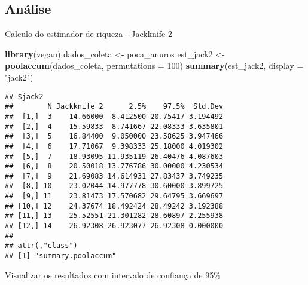 \documentclass[
]{book}
\newenvironment{Shaded}{\begin{snugshade}}{\end{snugshade}}
\newcommand{\DataTypeTok}[1]{\textcolor[rgb]{0.13,0.29,0.53}{#1}}
\newcommand{\DecValTok}[1]{\textcolor[rgb]{0.00,0.00,0.81}{#1}}
\newcommand{\KeywordTok}[1]{\textcolor[rgb]{0.13,0.29,0.53}{\textbf{#1}}}
\newcommand{\NormalTok}[1]{#1}
\newcommand{\StringTok}[1]{\textcolor[rgb]{0.31,0.60,0.02}{#1}}
\begin{document}
\hypertarget{anuxe1lise-4}{%
\subsection{Análise}\label{anuxe1lise-4}}

Calculo do estimador de riqueza - Jackknife 2

\begin{Shaded}
\begin{Highlighting}[]
\KeywordTok{library}\NormalTok{(vegan)}
\NormalTok{dados_coleta <-}\StringTok{ }\NormalTok{poca_anuros}
\NormalTok{est_jack2 <-}\StringTok{ }\KeywordTok{poolaccum}\NormalTok{(dados_coleta, }\DataTypeTok{permutations =} \DecValTok{100}\NormalTok{)}
\KeywordTok{summary}\NormalTok{(est_jack2, }\DataTypeTok{display =} \StringTok{"jack2"}\NormalTok{)}
\end{Highlighting}
\end{Shaded}

\begin{verbatim}
## $jack2
##        N Jackknife 2      2.5%    97.5%  Std.Dev
##  [1,]  3    14.66000  8.412500 20.75417 3.194492
##  [2,]  4    15.59833  8.741667 22.08333 3.635801
##  [3,]  5    16.84400  9.050000 23.58625 3.947466
##  [4,]  6    17.71067  9.398333 25.18000 4.019302
##  [5,]  7    18.93095 11.935119 26.40476 4.087603
##  [6,]  8    20.50018 13.776786 30.00000 4.230534
##  [7,]  9    21.69083 14.614931 27.83437 3.749235
##  [8,] 10    23.02044 14.977778 30.60000 3.899725
##  [9,] 11    23.81473 17.570682 29.64795 3.669697
## [10,] 12    24.37674 18.492424 28.49242 3.192388
## [11,] 13    25.52551 21.301282 28.60897 2.255938
## [12,] 14    26.92308 26.923077 26.92308 0.000000
## 
## attr(,"class")
## [1] "summary.poolaccum"
\end{verbatim}

Visualizar os resultados com intervalo de confiança de 95\%
\end{document}

